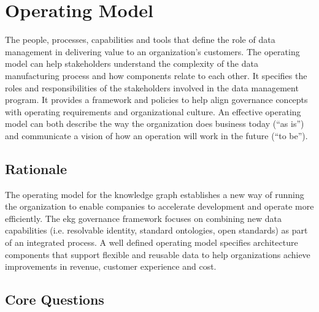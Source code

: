 \section{Operating Model}\label{sec:ekgmm-b-4-1} %

The people, processes, capabilities and tools that define the role of data management in delivering value to an organization’s customers.
The operating model can help stakeholders understand the complexity of the data manufacturing process and how components relate to each other.
It specifies the roles and responsibilities of the stakeholders involved in the data management program.
It provides a framework and policies to help align governance concepts with operating requirements and organizational culture.
An effective operating model can both describe the way the organization does business today (“as is”) and communicate a vision of how an operation will work in the future (“to be”).

\subsection*{ Rationale}

The operating model for the knowledge graph establishes a new way of running the organization to enable companies to accelerate development and operate more efficiently.
The \acrshort{ekg} governance framework focuses on combining new data capabilities (i.e. resolvable identity, standard ontologies, open standards) as part of an integrated process.
A well defined operating model specifies architecture components that support flexible and reusable data to help organizations achieve improvements in revenue, customer experience and cost.

\subsection*{Core Questions}

